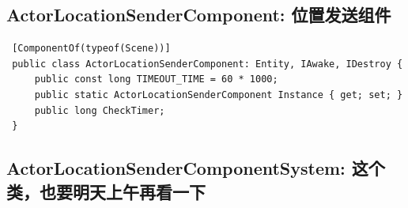 \documentclass[9pt, b5paper]{article}
\begin{document}
\subsection{ActorLocationSenderComponent: 位置发送组件}
\label{sec-2-8}
\begin{verbatim}
 [ComponentOf(typeof(Scene))]
 public class ActorLocationSenderComponent: Entity, IAwake, IDestroy {
     public const long TIMEOUT_TIME = 60 * 1000;
     public static ActorLocationSenderComponent Instance { get; set; }
     public long CheckTimer;
 }
\end{verbatim}
\subsection{ActorLocationSenderComponentSystem: 这个类，也要明天上午再看一下}
\label{sec-2-9}
\end{document}
